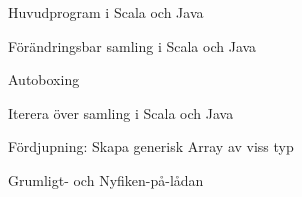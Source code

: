 \begin{Slide}{Huvudprogram i Scala och Java}
\end{Slide}

\begin{Slide}{Förändringsbar samling i Scala och Java}
\end{Slide}

\begin{Slide}{Autoboxing}
\end{Slide}

\begin{Slide}{Iterera över samling i Scala och Java}
\end{Slide}

\begin{Slide}{Fördjupning: Skapa generisk Array av viss typ}
\end{Slide}

\begin{Slide}{Grumligt- och Nyfiken-på-lådan}
\end{Slide}


\fi










